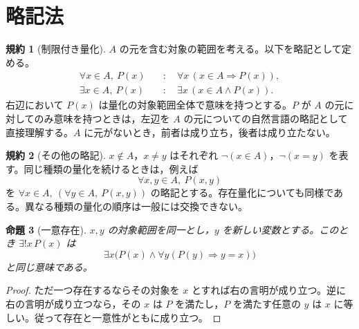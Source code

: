 \documentclass[a5paper,10pt,dvipdfmx]{jsarticle}
\theoremstyle{definition}
\newtheorem{ruledef}{規約}[section]
\theoremstyle{plain}
\newtheorem{prop}[ruledef]{命題}
\begin{document}
\section{略記法}
\begin{ruledef}[制限付き量化]
$A$ の元を含む対象の範囲を考える。以下を略記として定める。
\begin{align*}
\forall x\in A,\ P(x)&\quad:\quad \forall x\,(x\in A\Rightarrow P(x)),\\
\exists x\in A,\ P(x)&\quad:\quad \exists x\,(x\in A\land P(x)).
\end{align*}
右辺において $P(x)$ は量化の対象範囲全体で意味を持つとする。$P$ が $A$ の元に対してのみ意味を持つときは，左辺を $A$ の元についての自然言語の略記として直接理解する。$A$ に元がないとき，前者は成り立ち，後者は成り立たない。
\end{ruledef}
\begin{ruledef}[その他の略記]
$x\notin A$，$x\ne y$ はそれぞれ $\neg(x\in A)$，$\neg(x=y)$ を表す。同じ種類の量化を続けるときは，例えば
\[
\forall x,y\in A,\ P(x,y)
\]
を $\forall x\in A,\ (\forall y\in A,\ P(x,y))$ の略記とする。存在量化についても同様である。異なる種類の量化の順序は一般には交換できない。
\end{ruledef}
\begin{prop}[一意存在]
$x,y$ の対象範囲を同一とし，$y$ を新しい変数とする。このとき $\exists!x\,P(x)$ は
\[
\exists x\bigl(P(x)\land\forall y(P(y)\Rightarrow y=x)\bigr)
\]
と同じ意味である。
\end{prop}
\begin{proof}
ただ一つ存在するならその対象を $x$ とすれば右の言明が成り立つ。逆に右の言明が成り立つなら，その $x$ は $P$ を満たし，$P$ を満たす任意の $y$ は $x$ に等しい。従って存在と一意性がともに成り立つ。
\end{proof}
\end{document}
